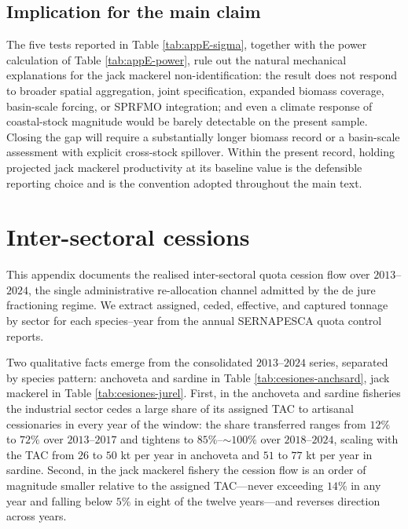 \documentclass[
  11pt,
]{article}
\begin{document}
\subsection{Implication for the main claim}\label{sec:appendix-spatial-implication}

The five tests reported in Table \ref{tab:appE-sigma}, together with
the power calculation of Table \ref{tab:appE-power}, rule out the
natural mechanical explanations for the jack mackerel non-identification:
the result does not respond to broader spatial aggregation, joint
specification, expanded biomass coverage, basin-scale forcing, or
SPRFMO integration; and even a climate response of coastal-stock
magnitude would be barely detectable on the present sample. Closing
the gap will require a substantially longer biomass record or a
basin-scale assessment with explicit cross-stock spillover. Within
the present record, holding projected jack mackerel productivity at
its baseline value is the defensible reporting choice and is the
convention adopted throughout the main text.

\section{Inter-sectoral cessions}\label{appendix-portfolio}

This appendix documents the realised inter-sectoral quota cession flow over \(2013\)--\(2024\), the single administrative re-allocation channel admitted by the de jure fractioning regime. We extract assigned, ceded, effective, and captured tonnage by sector for each species--year from the annual SERNAPESCA quota control reports.

Two qualitative facts emerge from the consolidated \(2013\)--\(2024\) series, separated by species pattern: anchoveta and sardine in Table \ref{tab:cesiones-anchsard}, jack mackerel in Table \ref{tab:cesiones-jurel}. First, in the anchoveta and sardine fisheries the industrial sector cedes a large share of its assigned TAC to artisanal cessionaries in every year of the window: the share transferred ranges from \(12\%\) to \(72\%\) over \(2013\)--\(2017\) and tightens to \(85\%\)--\(\sim\!100\%\) over \(2018\)--\(2024\), scaling with the TAC from \(26\) to \(50\) kt per year in anchoveta and \(51\) to \(77\) kt per year in sardine. Second, in the jack mackerel fishery the cession flow is an order of magnitude smaller relative to the assigned TAC---never exceeding \(14\%\) in any year and falling below \(5\%\) in eight of the twelve years---and reverses direction across years.
\end{document}
